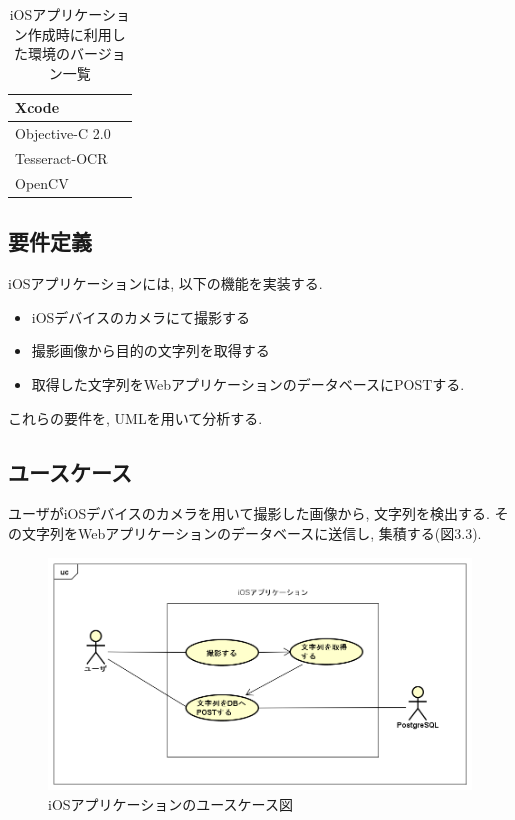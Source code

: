 \begin{table}
\begin{center}
\begin{tabular}{|l|l|} \hline
Xcode &  \\ \hline
Objective-C 2.0 & \\ \hline
Tesseract-OCR & \\ \hline
OpenCV & \\ \hline
\end{tabular}
\end{center}
\caption{iOSアプリケーション作成時に利用した環境のバージョン一覧}
\end{table}

\subsection{要件定義}
iOSアプリケーションには, 以下の機能を実装する.
\begin{screen}
\begin{itemize}
\item iOSデバイスのカメラにて撮影する
\item 撮影画像から目的の文字列を取得する
\item 取得した文字列をWebアプリケーションのデータベースにPOSTする.
\end{itemize}
\end{screen}

これらの要件を, UMLを用いて分析する.

\subsection{ユースケース}
ユーザがiOSデバイスのカメラを用いて撮影した画像から, 文字列を検出する.
その文字列をWebアプリケーションのデータベースに送信し, 集積する(図3.3).

\begin{figure}
\begin{center}
\includegraphics[width=16cm]{fig/usecase_ios.png}
\end{center}
\caption{iOSアプリケーションのユースケース図}
\end{figure}

